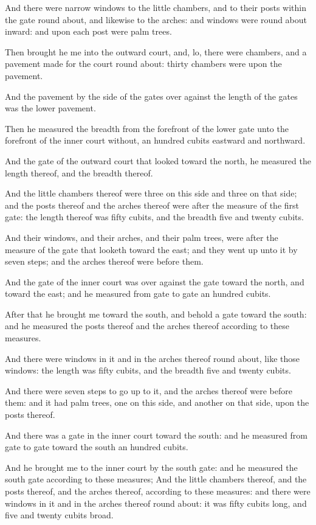 \Verse And there were narrow windows to the little chambers, and to their posts within the gate round about, and likewise to the arches: and windows were round about inward: and upon each post were palm trees.

\Verse Then brought he me into the outward court, and, lo, there were chambers, and a pavement made for the court round about: thirty chambers were upon the pavement.

\Verse And the pavement by the side of the gates over against the length of the gates was the lower pavement.

\Verse Then he measured the breadth from the forefront of the lower gate unto the forefront of the inner court without, an hundred cubits eastward and northward.

\Verse And the gate of the outward court that looked toward the north, he measured the length thereof, and the breadth thereof.

\Verse And the little chambers thereof were three on this side and three on that side; and the posts thereof and the arches thereof were after the measure of the first gate: the length thereof was fifty cubits, and the breadth five and twenty cubits.

\Verse And their windows, and their arches, and their palm trees, were after the measure of the gate that looketh toward the east; and they went up unto it by seven steps; and the arches thereof were before them.

\Verse And the gate of the inner court was over against the gate toward the north, and toward the east; and he measured from gate to gate an hundred cubits.

\Verse After that he brought me toward the south, and behold a gate toward the south: and he measured the posts thereof and the arches thereof according to these measures.

\Verse And there were windows in it and in the arches thereof round about, like those windows: the length was fifty cubits, and the breadth five and twenty cubits.

\Verse And there were seven steps to go up to it, and the arches thereof were before them: and it had palm trees, one on this side, and another on that side, upon the posts thereof.

\Verse And there was a gate in the inner court toward the south: and he measured from gate to gate toward the south an hundred cubits.

\Verse And he brought me to the inner court by the south gate: and he measured the south gate according to these measures; \Verse And the little chambers thereof, and the posts thereof, and the arches thereof, according to these measures: and there were windows in it and in the arches thereof round about: it was fifty cubits long, and five and twenty cubits broad.

